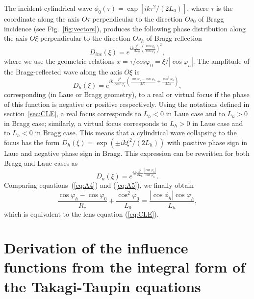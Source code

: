 \documentclass[preprint]{iucr}              %
\begin{document}
The incident cylindrical wave $\phi_0(\tau)=\exp[i k \tau^2 / (2L_0)]$, where $\tau$ is the coordinate along the axis $O\tau$ perpendicular to the direction $Os_0$ of Bragg incidence (see Fig.~\ref{fig:vectors}), produces the following phase distribution along the axis $O\xi$ perpendicular to the direction $Os_h$ of Bragg reflection 
\begin{equation}
    D_{inc}(\xi) = e^{i k \frac{\xi^2}{2L_0}\left(\frac{\cos\varphi_0}{\cos\varphi_h}\right)^2},
\end{equation}
where we use the geometric relations $x=\tau/cos\varphi_0=\xi/|\cos\varphi_h|$. The amplitude of the Bragg-reflected wave along the axis $O\xi$ is
\begin{equation}
\label{eq:A4}
    D_h(\xi) = e^{i k
    \frac{\xi^2}{\cos^2\varphi_h}\left(\frac{\cos\varphi_h-\cos\varphi_0}{2R_c} + \frac{\cos^2\varphi_0}{2L_0}\right)},
\end{equation}
corresponding (in Laue or Bragg geometry), to a real or virtual focus if the phase of this function is negative or positive respectively. Using the notations defined in section~\ref{sec:CLE}, a real focus corresponds to $L_h<0$ in Laue case and to $L_h>0$ in Bragg case; similarly, a virtual focus corresponds to $L_h>0$ in Laue case and to $L_h<0$ in Bragg case. This means that a cylindrical wave collapsing to the focus has the form $D_h(\xi) = \exp(\pm i k \xi^2 / (2L_h))$ with positive phase sign in Laue and negative phase sign in Bragg. This expression can be rewritten for both Bragg and Laue cases as
\begin{equation}
\label{eq:A5}
D_u(\xi) = e^{i k \frac{\xi^2}{2 L_h}\frac{|\cos\varphi_h|}{\cos\varphi_h}}.   
\end{equation}
Comparing equations~(\ref{eq:A4}) and (\ref{eq:A5}), we finally obtain
\begin{equation}
    \frac{\cos\varphi_h-\cos\varphi_0}{R_c}+
    \frac{\cos^2\varphi_0}{L_0}=\frac{|\cos\phi_h|\cos\varphi_h}{L_h},
\end{equation}
which is equivalent to the lens equation (\ref{eq:CLE}).

\section{Derivation of the influence functions from the integral form of the Takagi-Taupin equations}
\label{appendix:TTEintegral}
\end{document}
